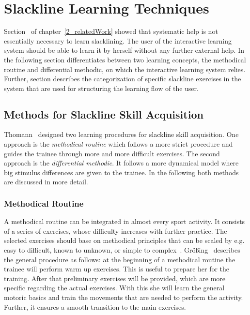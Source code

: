 \section{Slackline Learning Techniques}\label{3_3_learningTechniques}
Section~\textit{} of chapter~\ref{2_relatedWork} showed that systematic help is not essentially necessary to learn slacklining. The user of the interactive learning system should be able to learn it by herself without any further external help. In the following section \textit{} differentiates between two learning concepts, the methodical routine and differential methodic, on which the interactive learning system relies.
Further, section \textit{} describes the categorization of specific slackline exercises in the system that are used for structuring the learning flow of the user.

\subsection{Methods for Slackline Skill Acquisition}\label{3_3_1_learningConcepts}
Thomann~\cite{Thomann2013-aa} designed two learning procedures for slackline skill acquisition. One approach is the \textit{methodical routine} which follows a more strict procedure and guides the trainee through more and more difficult exercises. The second approach is the \textit{differential methodic}. It follows a more dynamical model where big stimulus differences are given to the trainee. In the following both methods are discussed in more detail.

\subsubsection{Methodical Routine}
A methodical routine can be integrated in almost every sport activity. It consists of a series of exercises, whose difficulty increases with further practice. The selected exercises should base on methodical principles that can be scaled by e.g. easy to difficult, known to unknown, or simple to complex~\cite{Fetz1996-ml}. Größing~\cite{Groessing1997-sp} describes the general procedure as follows: at the beginning of a methodical routine the trainee will perform warm up exercises. This is useful to prepare her for the training. After that preliminary exercises will be provided, which are more specific regarding the actual exercises. With this she will learn the general motoric basics and train the movements that are needed to perform the activity. Further, it ensures a smooth transition to the main exercises.

